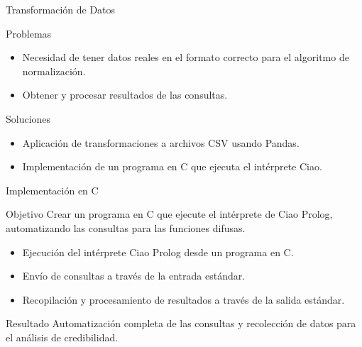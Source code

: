 \documentclass{beamer}
\newcommand{\slideauthor}[1]{\gdef\insertslideauthor{#1}}
\begin{document}
\begin{frame}{Transformación de Datos}
\slideauthor{Francisco J. González}
    \begin{block}{Problemas}
        \begin{itemize}
            \item Necesidad de tener datos reales en el formato correcto para el algoritmo de normalización.
            \item Obtener y procesar resultados de las consultas.
        \end{itemize}
    \end{block}
    \begin{block}{Soluciones}
        \begin{itemize}
            \item Aplicación de transformaciones a archivos CSV usando Pandas.
            \item Implementación de un programa en C que ejecuta el intérprete Ciao.
        \end{itemize}
    \end{block}
\end{frame}

\begin{frame}{Implementación en C}
\slideauthor{Francisco J. González}
    \begin{block}{Objetivo}
        Crear un programa en C que ejecute el intérprete de Ciao Prolog, automatizando las consultas para las funciones difusas.
    \end{block}
    \begin{itemize}
        \item Ejecución del intérprete Ciao Prolog desde un programa en C.
        \item Envío de consultas a través de la entrada estándar.
        \item Recopilación y procesamiento de resultados a través de la salida estándar.
    \end{itemize}
    \begin{block}{Resultado}
        Automatización completa de las consultas y recolección de datos para el análisis de credibilidad.
    \end{block}
\end{frame}
\end{document}
